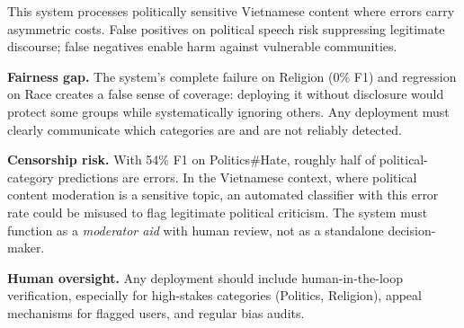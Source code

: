 \documentclass[conference]{IEEEtran}
\begin{document}
This system processes politically sensitive Vietnamese content where errors carry
asymmetric costs. False positives on political speech risk suppressing legitimate
discourse; false negatives enable harm against vulnerable communities.

\textbf{Fairness gap.} The system's complete failure on Religion (0\% F1) and
regression on Race creates a false sense of coverage: deploying it without
disclosure would protect some groups while systematically ignoring others. Any
deployment must clearly communicate which categories are and are not reliably
detected.

\textbf{Censorship risk.} With 54\% F1 on Politics\#Hate, roughly half of
political-category predictions are errors. In the Vietnamese context, where
political content moderation is a sensitive topic, an automated classifier with
this error rate could be misused to flag legitimate political criticism. The
system must function as a \textit{moderator aid} with human review, not as a
standalone decision-maker.

\textbf{Human oversight.} Any deployment should include human-in-the-loop
verification, especially for high-stakes categories (Politics, Religion), appeal
mechanisms for flagged users, and regular bias audits.
\end{document}
